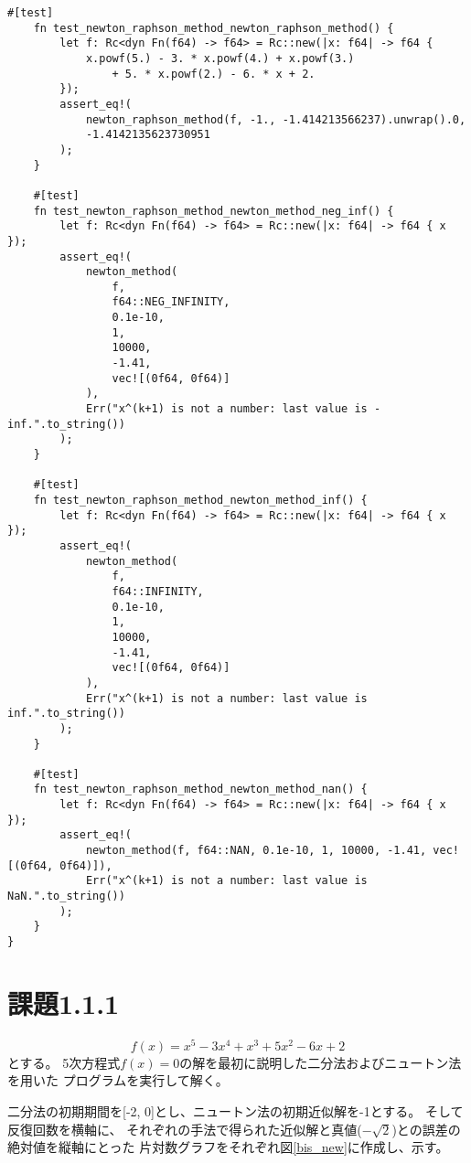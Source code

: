 \documentclass[uplatex, 11pt,a4j, titlepage]{jsarticle}
\begin{document}
\begin{lstlisting}[caption={newton\_raphson\_method.rs}]
    #[test]
    fn test_newton_raphson_method_newton_raphson_method() {
        let f: Rc<dyn Fn(f64) -> f64> = Rc::new(|x: f64| -> f64 {
            x.powf(5.) - 3. * x.powf(4.) + x.powf(3.) 
                + 5. * x.powf(2.) - 6. * x + 2.
        });
        assert_eq!(
            newton_raphson_method(f, -1., -1.414213566237).unwrap().0,
            -1.4142135623730951
        );
    }
    
    #[test]
    fn test_newton_raphson_method_newton_method_neg_inf() {
        let f: Rc<dyn Fn(f64) -> f64> = Rc::new(|x: f64| -> f64 { x });
        assert_eq!(
            newton_method(
                f,
                f64::NEG_INFINITY,
                0.1e-10,
                1,
                10000,
                -1.41,
                vec![(0f64, 0f64)]
            ),
            Err("x^(k+1) is not a number: last value is -inf.".to_string())
        );
    }
    
    #[test]
    fn test_newton_raphson_method_newton_method_inf() {
        let f: Rc<dyn Fn(f64) -> f64> = Rc::new(|x: f64| -> f64 { x });
        assert_eq!(
            newton_method(
                f,
                f64::INFINITY,
                0.1e-10,
                1,
                10000,
                -1.41,
                vec![(0f64, 0f64)]
            ),
            Err("x^(k+1) is not a number: last value is inf.".to_string())
        );
    }
    
    #[test]
    fn test_newton_raphson_method_newton_method_nan() {
        let f: Rc<dyn Fn(f64) -> f64> = Rc::new(|x: f64| -> f64 { x });
        assert_eq!(
            newton_method(f, f64::NAN, 0.1e-10, 1, 10000, -1.41, vec![(0f64, 0f64)]),
            Err("x^(k+1) is not a number: last value is NaN.".to_string())
        );
    }
} 
\end{lstlisting}


\section{課題1.1.1}
\begin{equation}
    f(x) = x^5 - 3 x^4 + x^3 + 5 x^2 - 6x + 2 
\end{equation}
とする。
5次方程式$f(x) = 0$の解を最初に説明した二分法およびニュートン法を用いた
プログラムを実行して解く。


二分法の初期期間を[-2, 0]とし、ニュートン法の初期近似解を-1とする。
そして反復回数を横軸に、
それぞれの手法で得られた近似解と真値($-\sqrt{2}$)との誤差の絶対値を縦軸にとった
片対数グラフをそれぞれ図\ref{bis_new}に作成し、示す。
\end{document}
